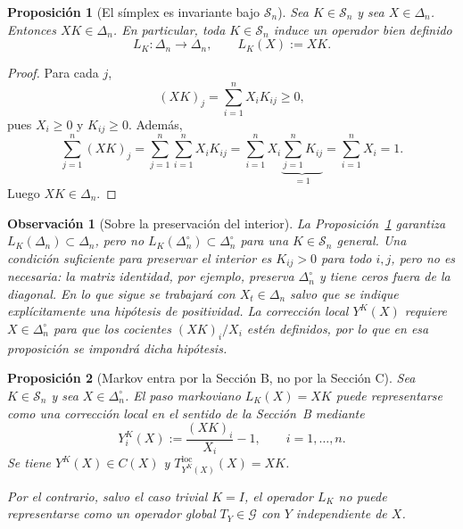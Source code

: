 ﻿\documentclass[12pt]{article}
\newtheorem{proposicion}{Proposición}[section]
\newtheorem{observacion}{Observación}[section]
\begin{document}
\begin{proposicion}[El símplex es invariante bajo $\mathcal{S}_n$]\label{prop:simplex_invariante}
Sea $K\in\mathcal{S}_n$ y sea $X\in\Delta_n$. Entonces $XK\in\Delta_n$. En particular, toda $K\in\mathcal{S}_n$ induce un operador bien definido
\[
L_K:\Delta_n\longrightarrow\Delta_n,\qquad L_K(X):=XK.
\]
\end{proposicion}

\begin{proof}
Para cada $j$,
\[
(XK)_j = \sum_{i=1}^n X_i K_{ij} \ge 0,
\]
pues $X_i\ge 0$ y $K_{ij}\ge 0$. Además,
\[
\sum_{j=1}^n (XK)_j
=\sum_{j=1}^n\sum_{i=1}^n X_iK_{ij}
=\sum_{i=1}^n X_i\underbrace{\sum_{j=1}^n K_{ij}}_{=1}
=\sum_{i=1}^n X_i=1.
\]
Luego $XK\in\Delta_n$.
\end{proof}

\begin{observacion}[Sobre la preservación del interior]\label{obs:interior_markov}
La Proposición~\ref{prop:simplex_invariante} garantiza $L_K(\Delta_n)\subset\Delta_n$, pero no $L_K(\Delta_n^\circ)\subset\Delta_n^\circ$ para una $K\in\mathcal{S}_n$ general. Una condición \emph{suficiente} para preservar el interior es $K_{ij}>0$ para todo $i,j$, pero no es necesaria: la matriz identidad, por ejemplo, preserva $\Delta_n^\circ$ y tiene ceros fuera de la diagonal. En lo que sigue se trabajará con $X_t\in\Delta_n$ salvo que se indique explícitamente una hipótesis de positividad. La corrección local $Y^K(X)$ requiere $X\in\Delta_n^\circ$ para que los cocientes $(XK)_i/X_i$ estén definidos, por lo que en esa proposición se impondrá dicha hipótesis.
\end{observacion}

\begin{proposicion}[Markov entra por la Sección B, no por la Sección C]\label{prop:markov_es_local}
Sea $K\in\mathcal{S}_n$ y sea $X\in\Delta_n^\circ$. El paso markoviano $L_K(X)=XK$ puede representarse como una corrección local en el sentido de la Sección~B mediante
\[
Y^K_i(X) := \frac{(XK)_i}{X_i}-1, \qquad i=1,\dots,n.
\]
Se tiene $Y^K(X)\in C(X)$ y $T^{\mathrm{loc}}_{Y^K(X)}(X)=XK$.

Por el contrario, salvo el caso trivial $K=I$, el operador $L_K$ no puede representarse como un operador global $T_Y\in\mathcal{G}$ con $Y$ independiente de $X$.
\end{proposicion}
\end{document}
